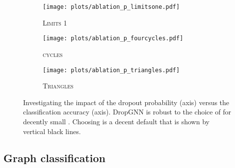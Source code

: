 \documentclass{article}
\begin{document}
\begin{figure}
\begin{subfigure}{0.3\textwidth}
    \centering
    \texttt{[image: plots/ablation\_p\_limitsone.pdf]}
    \caption{\textsc{Limits 1}}
    \label{fig:p_ablation_limitsone}
\end{subfigure}\hfill
\begin{subfigure}{0.3\textwidth}
    \centering
    \texttt{[image: plots/ablation\_p\_fourcycles.pdf]}
    \caption{\textsc{cycles}}
    \label{fig:p_ablation-4cycles}
\end{subfigure}\hfill
\begin{subfigure}{0.3\textwidth}
    \centering
    \texttt{[image: plots/ablation\_p\_triangles.pdf]}
    \caption{\textsc{Triangles}}
    \label{fig:p_ablation_triangles}
\end{subfigure}
    \caption{Investigating the impact of the dropout probability (axis) versus the classification accuracy (axis). DropGNN is robust to the choice of  for decently small . Choosing  is a decent default that is shown by vertical black lines.}
    \label{fig:p_ablation}
\end{figure}

\subsection{Graph classification}
\end{document}
